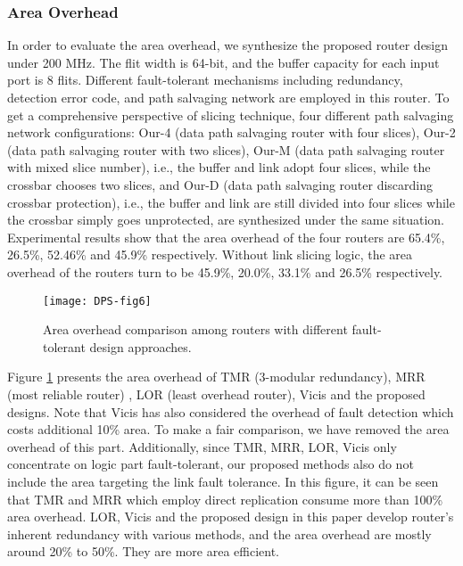 \subsubsection{Area Overhead}
In order to evaluate the area overhead, we synthesize the proposed router design under 200 MHz. The flit width is 64-bit, and the buffer capacity for each input port is 8 flits. Different fault-tolerant mechanisms including redundancy, detection error code, and path salvaging network are employed in this router. To get a comprehensive perspective of slicing technique, four different path salvaging network configurations: Our-4 (data path salvaging router with four slices), Our-2 (data path salvaging router with two slices), Our-M (data path salvaging router with mixed slice number), i.e., the buffer and link adopt four slices, while the crossbar chooses two slices, and Our-D (data path salvaging router discarding crossbar protection), i.e., the buffer and link are still divided into four slices while the crossbar simply goes unprotected, are synthesized under the same situation. Experimental results show that the area overhead of the four routers are 65.4\%,
26.5\%, 52.46\% and 45.9\% respectively. Without link slicing logic, the area overhead of the routers turn to be 45.9\%, 20.0\%, 33.1\% and 26.5\% respectively.

\begin{figure}[h]
      \centering
        \texttt{[image: DPS-fig6]}
        \caption{Area overhead comparison among routers with different fault-tolerant design approaches.}
        \label{fig:dps-fig6}
\end{figure}

Figure \ref{fig:dps-fig6} presents the area overhead of TMR (3-modular redundancy), MRR (most reliable router) \cite{constantinides2006bulletproof}, LOR (least overhead router)\cite{constantinides2006bulletproof}, Vicis\cite{fick2009highly} and the proposed designs. Note that Vicis has also considered the overhead of fault detection which costs additional 10\% area. To make a fair comparison, we have removed the area overhead of this part. Additionally, since TMR, MRR, LOR, Vicis only concentrate on logic part fault-tolerant, our proposed methods also do not include the area targeting the link fault tolerance. In this figure, it can be seen that TMR and MRR which employ direct replication consume more than 100\% area overhead. LOR, Vicis and the proposed design in this paper develop router's inherent redundancy with various methods, and the area overhead are mostly around 20\% to 50\%. They are more area efficient.

